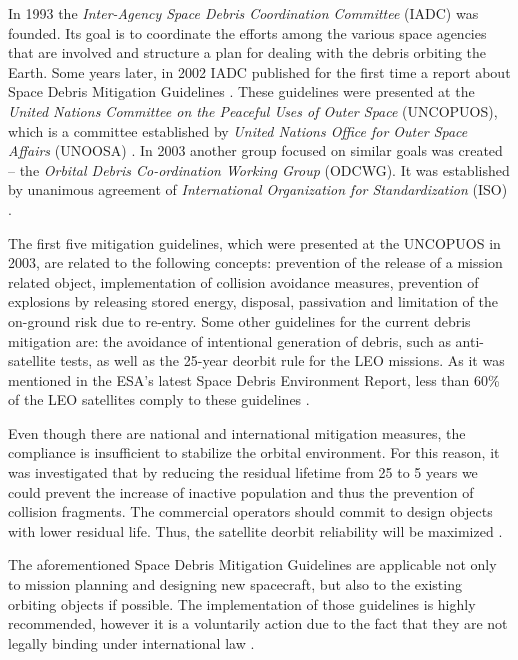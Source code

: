 In 1993 the \textit{Inter-Agency Space Debris Coordination Committee} (IADC) was founded. Its goal is to coordinate the efforts among the various space agencies that are involved and structure a plan for dealing with the debris orbiting the Earth. Some years later, in 2002 IADC published for the first time a report about Space Debris Mitigation Guidelines \cite{UNOOSA}. %
These guidelines were presented at the \textit{United Nations Committee on the Peaceful Uses of Outer Space} (UNCOPUOS), which is a committee established by \textit{United Nations Office for Outer Space Affairs} (UNOOSA) \cite{IADC 2007}. In 2003 another group focused on similar goals was created – the \textit{Orbital Debris Co-ordination Working Group} (ODCWG). It was established by unanimous agreement of \textit{International Organization for Standardization} (ISO) \cite{Klinkrad 2006}.

The first five mitigation guidelines, which were presented at the UNCOPUOS in 2003, are related to the following concepts: prevention of the release of a mission related object, implementation of collision avoidance measures, prevention of explosions by releasing stored energy, disposal, passivation and limitation of the on-ground risk due to re-entry. Some other guidelines for the current debris mitigation are: the avoidance of intentional generation of debris, such as anti-satellite tests, as well as the 25-year deorbit rule for the LEO missions. As it was mentioned in the ESA's latest Space Debris Environment Report, less than 60\% of the LEO satellites comply to these guidelines \cite{ESA 2020}. %

Even though there are national and international mitigation measures, the compliance is insufficient to stabilize the orbital environment. For this reason, it was investigated that by reducing the residual lifetime from 25 to 5 years we could prevent the increase of inactive population and thus the prevention of collision fragments. The commercial operators should commit to design objects with lower residual life. Thus, the satellite deorbit reliability will be maximized \cite{Somma 2019}.

The aforementioned Space Debris Mitigation Guidelines are applicable not only to mission planning and designing new spacecraft, but also to the existing orbiting objects if possible. The implementation of those guidelines is highly recommended, however it is a voluntarily action due to the fact that they are not legally binding under international law \cite{UNOOSA}.

